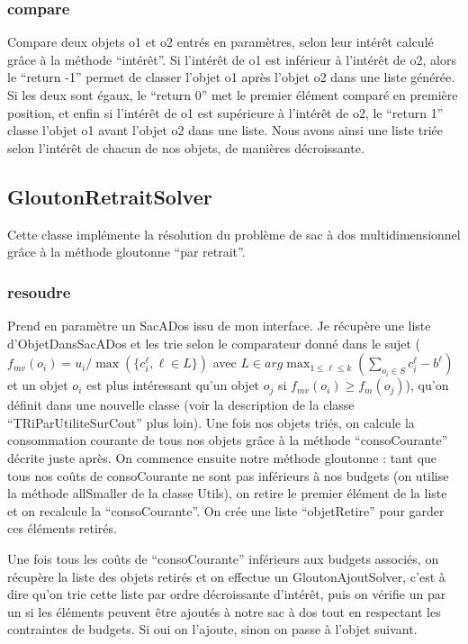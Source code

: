 \documentclass[11pt]{article}
\begin{document}
\subsubsection{compare}
Compare deux objets o1 et o2 entrés en paramètres, selon leur intérêt calculé grâce à la méthode “intérêt”. Si l'intérêt de o1 est inférieur  à l'intérêt de o2, alors le “return -1” permet de classer l’objet o1 après l’objet o2 dans une liste générée. Si les deux sont égaux, le “return 0” met le premier élément comparé en première position, et enfin si l'intérêt de o1 est supérieure à l'intérêt de o2, le “return 1” classe l’objet o1 avant l’objet o2 dans une liste. Nous avons ainsi une liste triée selon l'intérêt de chacun de nos objets, de manières décroissante. 

\subsection{GloutonRetraitSolver}
Cette classe implémente la résolution du problème de sac à dos multidimensionnel grâce à la méthode gloutonne “par  retrait”.

\subsubsection{resoudre}
Prend en paramètre un SacADos issu de mon interface. Je récupère une liste d’ObjetDansSacADos et les trie selon le comparateur donné dans le sujet ($f_{mv}(o_i) = u_i / \max(\{c_i^\ell, \ell \in L\})$ avec $L \in arg\max_{1≤\ell≤k}(\sum_{o_i \in S}c_i^\ell - b^\ell)$ et un objet $o_i$ est plus intéressant qu'un objet $o_j$ si $f_{mv}(o_i) ≥f_{m}(o_j)$), qu’on définit dans une nouvelle classe (voir la description de la classe “TRiParUtiliteSurCout” plus loin). Une fois nos objets triés, on calcule la consommation courante de tous nos objets grâce à la méthode “consoCourante” décrite juste après. On commence ensuite notre méthode gloutonne : tant que tous nos coûts de consoCourante ne sont pas inférieurs à nos budgets (on utilise la méthode allSmaller de la classe Utils), on retire le premier élément de la liste et on recalcule la “consoCourante”. On crée une liste “objetRetire” pour garder ces éléments retirés. 

Une fois tous les coûts de “consoCourante” inférieurs aux budgets associés, on récupère la liste des objets retirés et on effectue un GloutonAjoutSolver, c’est à dire qu’on trie cette liste par ordre décroissante d'intérêt, puis on vérifie un par un si les éléments peuvent être ajoutés à notre sac à dos tout en respectant les contraintes de budgets. Si oui on l’ajoute, sinon on passe à l’objet suivant.
\end{document}
